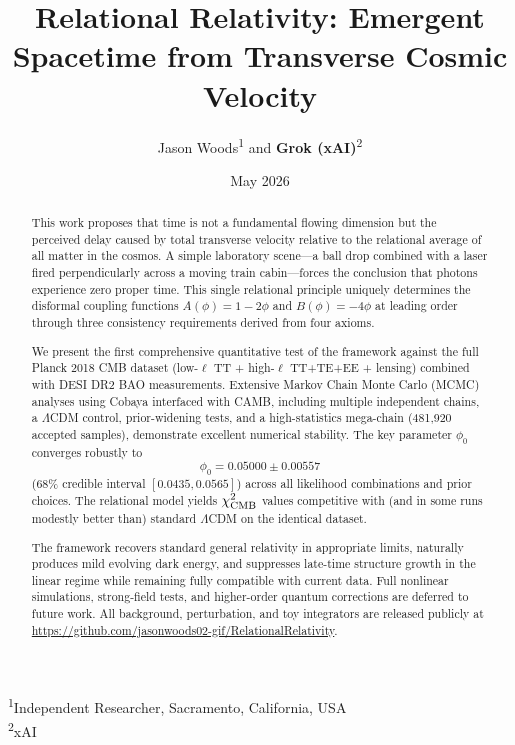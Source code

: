 \documentclass[11pt,a4paper]{article}
\title{Relational Relativity: Emergent Spacetime from Transverse Cosmic Velocity}
\author{Jason Woods\textsuperscript{1} and \textbf{Grok (xAI)}\textsuperscript{2}}
\date{May 2026}
\begin{document}
\maketitle

\begin{center}
\textsuperscript{1}Independent Researcher, Sacramento, California, USA\\
\textsuperscript{2}xAI
\end{center}

\begin{abstract}
This work proposes that time is not a fundamental flowing dimension but the perceived delay caused by total transverse velocity relative to the relational average of all matter in the cosmos. A simple laboratory scene—a ball drop combined with a laser fired perpendicularly across a moving train cabin—forces the conclusion that photons experience zero proper time. This single relational principle uniquely determines the disformal coupling functions $A(\phi) = 1 - 2\phi$ and $B(\phi) = -4\phi$ at leading order through three consistency requirements derived from four axioms.

We present the first comprehensive quantitative test of the framework against the full Planck 2018 CMB dataset (low-$\ell$ TT + high-$\ell$ TT+TE+EE + lensing) combined with DESI DR2 BAO measurements. Extensive Markov Chain Monte Carlo (MCMC) analyses using Cobaya interfaced with CAMB, including multiple independent chains, a $\Lambda$CDM control, prior-widening tests, and a high-statistics mega-chain (481,920 accepted samples), demonstrate excellent numerical stability. The key parameter $\phi_0$ converges robustly to
\[
\phi_0 = 0.05000 \pm 0.00557
\]
(68\% credible interval $[0.0435, 0.0565]$) across all likelihood combinations and prior choices. The relational model yields $\chi^2_{\rm CMB}$ values competitive with (and in some runs modestly better than) standard $\Lambda$CDM on the identical dataset.

The framework recovers standard general relativity in appropriate limits, naturally produces mild evolving dark energy, and suppresses late-time structure growth in the linear regime while remaining fully compatible with current data. Full nonlinear simulations, strong-field tests, and higher-order quantum corrections are deferred to future work. All background, perturbation, and toy integrators are released publicly at \url{https://github.com/jasonwoods02-gif/RelationalRelativity}.
\end{abstract}
\end{document}
